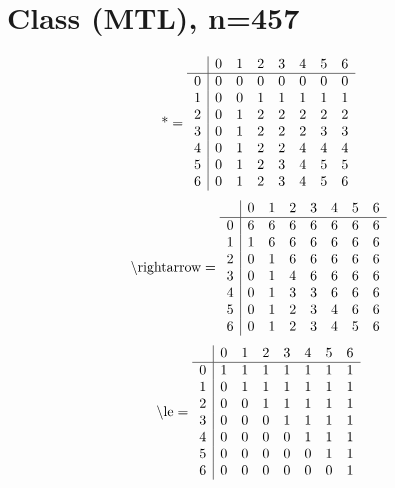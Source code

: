 \documentclass[11pt]{article}
\begin{document}
\section{Class (MTL), n=457}
\[\text{*} = 
\begin{array}{r | r r r r r r r}
 & 0 & 1 & 2 & 3 & 4 & 5 & 6 \\ \hline
0 & 0 & 0 & 0 & 0 & 0 & 0 & 0 \\
1 & 0 & 0 & 1 & 1 & 1 & 1 & 1 \\
2 & 0 & 1 & 2 & 2 & 2 & 2 & 2 \\
3 & 0 & 1 & 2 & 2 & 2 & 3 & 3 \\
4 & 0 & 1 & 2 & 2 & 4 & 4 & 4 \\
5 & 0 & 1 & 2 & 3 & 4 & 5 & 5 \\
6 & 0 & 1 & 2 & 3 & 4 & 5 & 6 \\
\end{array}
\]
\[\text{\textbackslash rightarrow} = 
\begin{array}{r | r r r r r r r}
 & 0 & 1 & 2 & 3 & 4 & 5 & 6 \\ \hline
0 & 6 & 6 & 6 & 6 & 6 & 6 & 6 \\
1 & 1 & 6 & 6 & 6 & 6 & 6 & 6 \\
2 & 0 & 1 & 6 & 6 & 6 & 6 & 6 \\
3 & 0 & 1 & 4 & 6 & 6 & 6 & 6 \\
4 & 0 & 1 & 3 & 3 & 6 & 6 & 6 \\
5 & 0 & 1 & 2 & 3 & 4 & 6 & 6 \\
6 & 0 & 1 & 2 & 3 & 4 & 5 & 6 \\
\end{array}
\]
\[\text{\textbackslash le} = 
\begin{array}{r | r r r r r r r}
 & 0 & 1 & 2 & 3 & 4 & 5 & 6 \\ \hline
0 & 1 & 1 & 1 & 1 & 1 & 1 & 1 \\
1 & 0 & 1 & 1 & 1 & 1 & 1 & 1 \\
2 & 0 & 0 & 1 & 1 & 1 & 1 & 1 \\
3 & 0 & 0 & 0 & 1 & 1 & 1 & 1 \\
4 & 0 & 0 & 0 & 0 & 1 & 1 & 1 \\
5 & 0 & 0 & 0 & 0 & 0 & 1 & 1 \\
6 & 0 & 0 & 0 & 0 & 0 & 0 & 1 \\
\end{array}
\]
\end{document}
